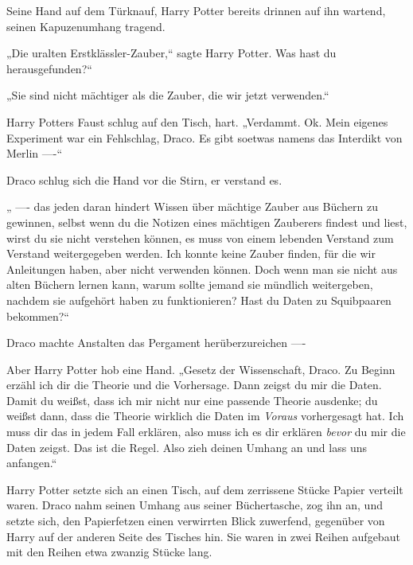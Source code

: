 {Seine Hand auf dem Türknauf, Harry Potter bereits drinnen auf ihn wartend, seinen Kapuzenumhang tragend.

„Die uralten Erstklässler-Zauber,“ sagte Harry Potter. Was hast du herausgefunden?“

„Sie sind nicht mächtiger als die Zauber, die wir jetzt verwenden.“

Harry Potters Faust schlug auf den Tisch, hart. „Verdammt. Ok. Mein eigenes Experiment war ein Fehlschlag, Draco. Es gibt soetwas namens das Interdikt von Merlin ----“

Draco schlug sich die Hand vor die Stirn, er verstand es.

„ ---- das jeden daran hindert Wissen über mächtige Zauber aus Büchern zu gewinnen, selbst wenn du die Notizen eines mächtigen Zauberers findest und liest, wirst du sie nicht verstehen können, es muss von einem lebenden Verstand zum Verstand weitergegeben werden. Ich konnte keine Zauber finden, für die wir Anleitungen haben, aber nicht verwenden können. Doch wenn man sie nicht aus alten Büchern lernen kann, warum sollte jemand sie mündlich weitergeben, nachdem sie aufgehört haben zu funktionieren? Hast du Daten zu Squibpaaren bekommen?“

Draco machte Anstalten das Pergament herüberzureichen ----

Aber Harry Potter hob eine Hand. „Gesetz der Wissenschaft, Draco. Zu Beginn erzähl ich dir die Theorie und die Vorhersage. Dann zeigst du mir die Daten. Damit du weißst, dass ich mir nicht nur eine passende Theorie ausdenke; du weißst dann, dass die Theorie wirklich die Daten im \emph{Voraus} vorhergesagt hat. Ich muss dir das in jedem Fall erklären, also muss ich es dir erklären \emph{bevor} du mir die Daten zeigst. Das ist die Regel. Also zieh deinen Umhang an und lass uns anfangen.“

Harry Potter setzte sich an einen Tisch, auf dem zerrissene Stücke Papier verteilt waren. Draco nahm seinen Umhang aus seiner Büchertasche, zog ihn an, und setzte sich, den Papierfetzen einen verwirrten Blick zuwerfend, gegenüber von Harry auf der anderen Seite des Tisches hin. Sie waren in zwei Reihen aufgebaut mit den Reihen etwa zwanzig Stücke lang.

}
